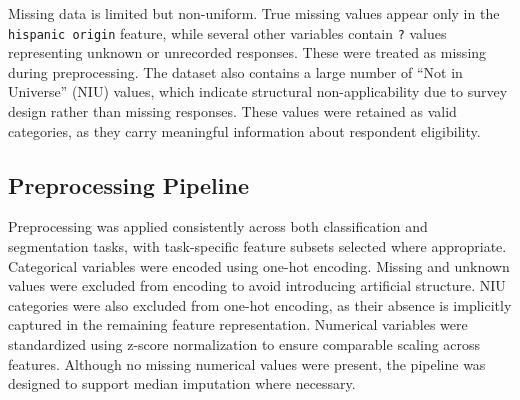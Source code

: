 Missing data is limited but non-uniform. True missing values appear only in the \texttt{hispanic origin} feature, while several other variables contain \texttt{?} values representing unknown or unrecorded responses. These were treated as missing during preprocessing. The dataset also contains a large number of ``Not in Universe'' (NIU) values, which indicate structural non-applicability due to survey design rather than missing responses. These values were retained as valid categories, as they carry meaningful information about respondent eligibility.

\subsection{Preprocessing Pipeline}

Preprocessing was applied consistently across both classification and segmentation tasks, with task-specific feature subsets selected where appropriate. Categorical variables were encoded using one-hot encoding. Missing and unknown values were excluded from encoding to avoid introducing artificial structure. NIU categories were also excluded from one-hot encoding, as their absence is implicitly captured in the remaining feature representation. Numerical variables were standardized using z-score normalization to ensure comparable scaling across features. Although no missing numerical values were present, the pipeline was designed to support median imputation where necessary.

